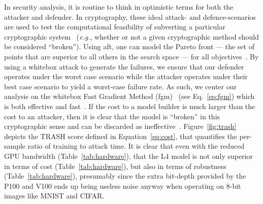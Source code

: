 \documentclass[sn-mathphys-num]{sn-jnl}%
\begin{document}
In security analysis, it is  routine to think in optimistic terms for both the attacker and defender. In cryptography, these ideal attack- and defence-scenarios are used to test the computational feasibility of subverting a particular cryptographic system~\cite{kamal2017study,leurent2020sha} (\textit{e.g.}, whether or not a given cryptographic method should be considered ``broken'').
Using \acrshort{aft}, one can model the Pareto front --- the set of points that are superior to all others in the search space --- for all objectives~\cite{zitzler2008quality}.
By using a whitebox attack to generate the failures, we ensure that our defender operates under the worst case scenario while the attacker operates under their best case scenario to yield a worst-case failure rate.
As such, we center our analysis on the whitebox Fast Gradient Method (\acrshort{fgm})~\cite{fgm} (see Eq.~\ref{eq:fgm}) which is both effective and fast~\cite{meyers}.
If the cost to a model builder is much larger than the cost to an attacker, then it is  clear that the model is ``broken'' in this cryptographic sense and can be discarded as ineffective~\cite{meyers_aft}.
Figure~\ref{fig:trash} depicts the TRASH score defined in Equation~\ref{eq:cost}, that quantifies the per-sample ratio of training to attack time.
It is clear that even with the reduced GPU bandwidth (Table~\ref{tab:hardware}), that the L4 model is not only superior in terms of cost (Table~\ref{tab:hardware}), but also in terms of robustness (Table~\ref{tab:hardware}), presumably since the extra bit-depth provided by the P100 and V100 ends up being useless noise anyway when operating on 8-bit images like MNIST and CIFAR.
\end{document}
